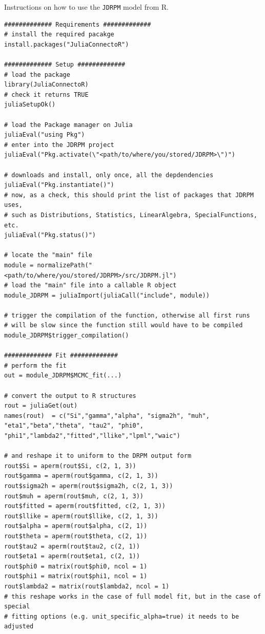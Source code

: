 \documentclass[12pt,	%
	a4paper,		%
	twoside,		%
	openright,		%
	titlepage,%
	]{book}
\theoremstyle{definition}
\newcommand{\mjline}[1]{\texttt{#1}}
\newenvironment{code}{\captionsetup{type=listing}}{}
\begin{document}
\begin{code}
\caption[Using \mjline{JDRPM} from R.]{Instructions on how to use the \mjline{JDRPM} model from R.}
\begin{verbatim}
############# Requirements #############
# install the required pacakge
install.packages("JuliaConnectoR")

############# Setup #############
# load the package
library(JuliaConnectoR)
# check it returns TRUE
juliaSetupOk() 

# load the Package manager on Julia
juliaEval("using Pkg")
# enter into the JDRPM project
juliaEval("Pkg.activate(\"<path/to/where/you/stored/JDRPM>\")")

# downloads and install, only once, all the depdendencies
juliaEval("Pkg.instantiate()") 
# now, as a check, this should print the list of packages that JDRPM uses,
# such as Distributions, Statistics, LinearAlgebra, SpecialFunctions, etc.
juliaEval("Pkg.status()") 

# locate the "main" file
module = normalizePath("<path/to/where/you/stored/JDRPM>/src/JDRPM.jl") 
# load the "main" file into a callable R object
module_JDRPM = juliaImport(juliaCall("include", module)) 

# trigger the compilation of the function, otherwise all first runs
# will be slow since the function still would have to be compiled
module_JDRPM$trigger_compilation()

############# Fit #############
# perform the fit
out = module_JDRPM$MCMC_fit(...) 

# convert the output to R structures
rout = juliaGet(out)
names(rout)  = c("Si","gamma","alpha", "sigma2h", "muh", "eta1","beta","theta", "tau2", "phi0", "phi1","lambda2","fitted","llike","lpml","waic")

# and reshape it to uniform to the DRPM output form
rout$Si = aperm(rout$Si, c(2, 1, 3))
rout$gamma = aperm(rout$gamma, c(2, 1, 3))
rout$sigma2h = aperm(rout$sigma2h, c(2, 1, 3))
rout$muh = aperm(rout$muh, c(2, 1, 3))
rout$fitted = aperm(rout$fitted, c(2, 1, 3))
rout$llike = aperm(rout$llike, c(2, 1, 3))
rout$alpha = aperm(rout$alpha, c(2, 1))
rout$theta = aperm(rout$theta, c(2, 1))
rout$tau2 = aperm(rout$tau2, c(2, 1))
rout$eta1 = aperm(rout$eta1, c(2, 1))
rout$phi0 = matrix(rout$phi0, ncol = 1)
rout$phi1 = matrix(rout$phi1, ncol = 1)
rout$lambda2 = matrix(rout$lambda2, ncol = 1)
# this reshape works in the case of full model fit, but in the case of special
# fitting options (e.g. unit_specific_alpha=true) it needs to be adjusted
\end{verbatim}
\label{julia connector instructions}
\end{code}
\end{document}
